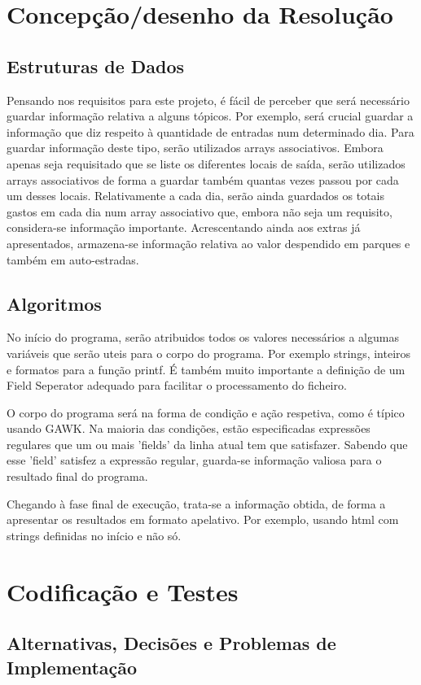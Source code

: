 \documentclass{report}
\begin{document}
\chapter{Concepção/desenho da Resolução} \label{cd}
\section{Estruturas de Dados}
Pensando nos requisitos para este projeto, é fácil de perceber que será necessário 
guardar informação relativa a alguns tópicos. Por exemplo, será crucial guardar a informação que diz respeito 
à quantidade de entradas num determinado dia. Para guardar informação deste tipo, serão utilizados arrays associativos. 
Embora apenas seja requisitado que se liste os diferentes locais de saída, serão utilizados arrays associativos de 
forma a guardar também quantas vezes passou por cada um desses locais. Relativamente a cada dia, serão ainda guardados os 
totais gastos em cada dia num array associativo que, embora não seja um requisito, considera-se informação importante. 
Acrescentando ainda aos extras já apresentados, armazena-se informação relativa ao valor despendido em parques e também em auto-estradas.
\section{Algoritmos}
No início do programa, serão atribuidos todos os valores necessários a algumas variáveis que serão uteis para o corpo do programa.
Por exemplo strings, inteiros e formatos para a função printf.
É também muito importante a definição de um Field Seperator adequado para facilitar o processamento do ficheiro.\par
O corpo do programa será na forma de condição e ação respetiva, como é típico usando GAWK. 
Na maioria das condições, estão especificadas expressões regulares que um ou mais 'fields' da linha atual tem que satisfazer. 
Sabendo que esse 'field' satisfez a expressão regular, guarda-se informação valiosa para o resultado final do programa.\par
Chegando à fase final de execução, trata-se a informação obtida, de forma a apresentar os resultados em formato apelativo. 
Por exemplo, usando html com strings definidas no início e não só.

\chapter{Codificação e Testes} \label{ct}
\section{Alternativas, Decisões e Problemas de Implementação}
\end{document}
